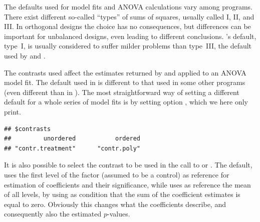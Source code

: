 \documentclass[krantz2]{krantz}\usepackage{knitr}
\begin{document}
\begin{warningbox}
The defaults used for model fits and ANOVA calculations vary among programs. There exist different so-called ``types'' of sums of squares, usually called I, II, and III. In orthogonal designs the choice has no consequences, but differences can be important for unbalanced designs, even leading to different conclusions. \Rlang's default, type~I, is usually considered to suffer milder problems than type~III, the default used by  and .

The contrasts used affect the estimates returned by  and  applied to an ANOVA model fit. The default used in \Rlang is different to that used in some other programs (even different than in \Slang). The most straightforward way of setting a different default for a whole series of model fits is by setting \Rlang option , which we here only print.

\begin{knitrout}\footnotesize
{}\color{fgcolor}\begin{kframe}
\begin{alltt}
\hlstd{(}\hlstd{)}
\end{alltt}
\begin{verbatim}
## $contrasts
##         unordered           ordered
## "contr.treatment"      "contr.poly"
\end{verbatim}
\end{kframe}
\end{knitrout}

It is also possible to select the contrast to be used in the call to  or . The default,  uses the first level of the factor (assumed to be a control) as reference for estimation of coefficients and their significance, while  uses as reference the mean of all levels, by using as condition that the sum of the coefficient estimates is equal to zero. Obviously this changes what the coefficients describe, and consequently also the estimated $p$-values.

\begin{knitrout}\footnotesize
{}\color{fgcolor}\begin{kframe}
\begin{alltt}
 \hlkwb{<-}  \hlopt{~}   
               \hlstd{=} \hlstd{(} 
  \hlkwb{<-}  \hlopt{~}   
               \hlstd{=} \hlstd{(} 
\end{alltt}
\end{kframe}
\end{knitrout}


\end{warningbox}
\end{document}
